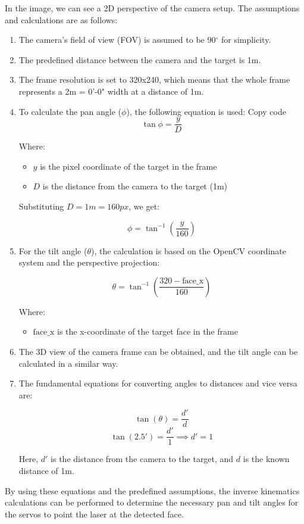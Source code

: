\documentclass[a4paper,11pt]{article}%
\begin{document}
In the image, we can see a 2D perspective of the camera setup. The assumptions and calculations are as follows:
\begin{enumerate}
    \item The camera's field of view (FOV) is assumed to be 90$^\circ$ for simplicity.
    \item The predefined distance between the camera and the target is 1m.
    \item The frame resolution is set to 320x240, which means that the whole frame represents a 2m = 0'-0" width at a distance of 1m.
    \item To calculate the pan angle ($\phi$), the following equation is used:
          Copy code$$\tan\phi = \frac{y}{D}$$

          Where:
          \begin{itemize}
              \item $y$ is the pixel coordinate of the target in the frame
              \item $D$ is the distance from the camera to the target (1m)
          \end{itemize}

          Substituting $D = 1m = 160px$, we get:

          $$\phi = \tan^{-1}\left(\frac{y}{160}\right)$$

    \item For the tilt angle ($\theta$), the calculation is based on the OpenCV coordinate system and the perspective projection:

          $$\theta = \tan^{-1}\left(\frac{320 - \text{face\_x}}{160}\right)$$

          Where:
          \begin{itemize}
              \item $\text{face\_x}$ is the x-coordinate of the target face in the frame
          \end{itemize}

    \item The 3D view of the camera frame can be obtained, and the tilt angle can be calculated in a similar way.

    \item The fundamental equations for converting angles to distances and vice versa are:

          $$\tan(\theta) = \frac{d'}{d}$$
          $$\tan(2.5') = \frac{d'}{1} \implies d' = 1$$

          Here, $d'$ is the distance from the camera to the target, and $d$ is the known distance of 1m.
\end{enumerate}
By using these equations and the predefined assumptions, the inverse kinematics calculations can be performed to determine the necessary pan and tilt angles for the servos to point the laser at the detected face.
\end{document}
